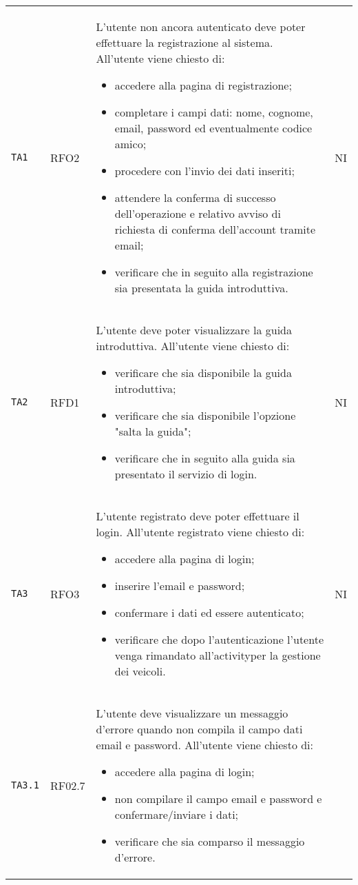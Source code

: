 \begin{longtable}{ >{\centering}p{} >{\centering}p{} >{\centering}p{}
			>{\centering}p{}}
		\texttt{TA1}	& RFO2 &	L'utente non ancora autenticato deve poter effettuare la registrazione al sistema. All'utente viene chiesto di:
		\begin{itemize}
			\item accedere alla pagina di registrazione;
			\item completare i campi dati: nome, cognome, email, password ed eventualmente codice amico;
			\item procedere con l'invio dei dati inseriti;
			\item attendere la conferma di successo dell'operazione e relativo avviso di richiesta di conferma dell'account tramite email;
			\item verificare che in seguito alla registrazione sia presentata la guida introduttiva.
		\end{itemize}	&	NI	\tabularnewline
		 \texttt{TA2}	& RFD1 &	L'utente deve poter visualizzare la guida introduttiva. All'utente viene chiesto di:
		 \begin{itemize}
		 	\item verificare che sia disponibile la guida introduttiva;
		 	\item verificare che sia disponibile l'opzione "salta la guida";
		 	\item verificare che in seguito alla guida sia presentato il servizio di login. 
		 \end{itemize}	&	NI	\tabularnewline
		 \texttt{TA3}	& RFO3 & L'utente registrato deve poter effettuare il login. All'utente registrato viene chiesto di:
		 \begin{itemize}
		 	\item accedere alla pagina di login;
		 	\item inserire l'email e password;
		 	\item confermare i dati ed essere autenticato;
		 	\item verificare che dopo l'autenticazione l'utente venga rimandato all'activity\glosp per la gestione dei veicoli.
		 \end{itemize}	&	NI	\tabularnewline
		 \texttt{TA3.1} & RF02.7	& L'utente deve visualizzare un messaggio d'errore quando non compila il campo dati email e password. All'utente viene chiesto di:
		 \begin{itemize}
		 	\item accedere alla pagina di login;
		 	\item non compilare il campo email e password e confermare/inviare i dati;
		 	\item verificare che sia comparso il messaggio d'errore.

\end{itemize}
\end{longtable}
